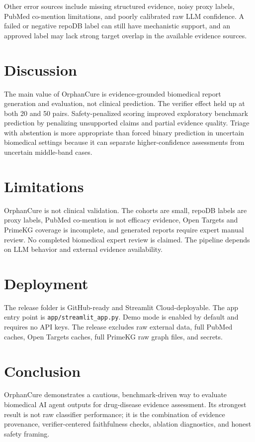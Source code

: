 \documentclass[11pt]{article}
\begin{document}
Other error sources include missing structured evidence, noisy proxy labels, PubMed co-mention limitations, and poorly calibrated raw LLM confidence. A failed or negative repoDB label can still have mechanistic support, and an approved label may lack strong target overlap in the available evidence sources.

\section{Discussion}
The main value of OrphanCure is evidence-grounded biomedical report generation and evaluation, not clinical prediction. The verifier effect held up at both 20 and 50 pairs. Safety-penalized scoring improved exploratory benchmark prediction by penalizing unsupported claims and partial evidence quality. Triage with abstention is more appropriate than forced binary prediction in uncertain biomedical settings because it can separate higher-confidence assessments from uncertain middle-band cases.

\section{Limitations}
OrphanCure is not clinical validation. The cohorts are small, repoDB labels are proxy labels, PubMed co-mention is not efficacy evidence, Open Targets and PrimeKG coverage is incomplete, and generated reports require expert manual review. No completed biomedical expert review is claimed. The pipeline depends on LLM behavior and external evidence availability.

\section{Deployment}
The release folder is GitHub-ready and Streamlit Cloud-deployable. The app entry point is \texttt{app/streamlit\_app.py}. Demo mode is enabled by default and requires no API keys. The release excludes raw external data, full PubMed caches, Open Targets caches, full PrimeKG raw graph files, and secrets.

\section{Conclusion}
OrphanCure demonstrates a cautious, benchmark-driven way to evaluate biomedical AI agent outputs for drug-disease evidence assessment. Its strongest result is not raw classifier performance; it is the combination of evidence provenance, verifier-centered faithfulness checks, ablation diagnostics, and honest safety framing.
\end{document}
